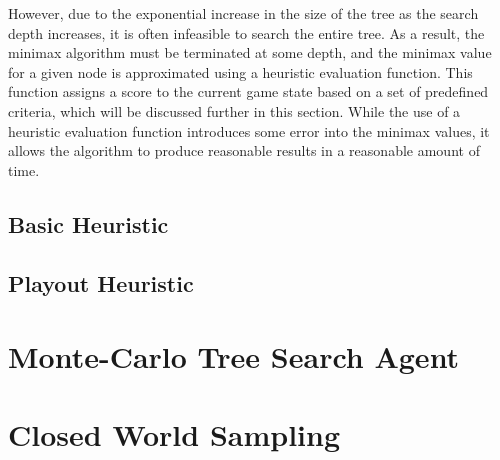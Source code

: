 However, due to the exponential increase in the size of the tree as the search depth increases, it is often infeasible to search the entire tree. As a result, the minimax algorithm must be terminated at some depth, and the minimax value for a given node is approximated using a heuristic evaluation function. This function assigns a score to the current game state based on a set of predefined criteria, which will be discussed further in this section. While the use of a heuristic evaluation function introduces some error into the minimax values, it allows the algorithm to produce reasonable results in a reasonable amount of time.

\subsection{Basic Heuristic}


\subsection{Playout Heuristic}



\section{Monte-Carlo Tree Search Agent}
\label{MCTS}

\section{Closed World Sampling}